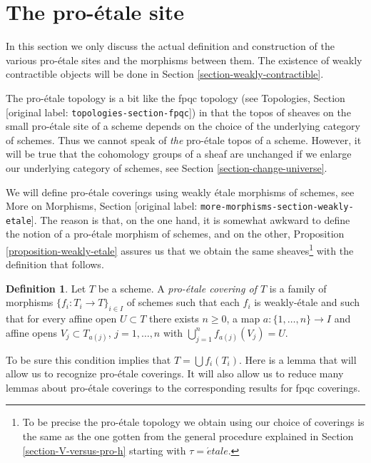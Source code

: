 \documentclass[10pt,a4paper]{article}
\theoremstyle{plain}
\theoremstyle{definition}
\newtheorem{definition}[subsection]{Definition}
\theoremstyle{remark}
\numberwithin{equation}{subsection}
\def\etale{{\acute{e}tale}}
\begin{document}
\section{The pro-\'etale site}
\label{section-proetale}

\noindent
In this section we only discuss the actual definition and construction
of the various pro-\'etale sites and the morphisms between them. The
existence of weakly contractible objects will be done in
Section \ref{section-weakly-contractible}.

\medskip\noindent
The pro-\'etale topology is a bit like
the fpqc topology (see Topologies, Section \textnormal{[original label: \nolinkurl{topologies-section-fpqc}]})
in that the topos of sheaves on the small pro-\'etale site of a scheme
depends on the choice of the underlying category of schemes. Thus we cannot
speak of {\it the} pro-\'etale topos of a scheme. However, it will be
true that the cohomology groups of a sheaf are unchanged if we enlarge
our underlying category of schemes, see Section \ref{section-change-universe}.

\medskip\noindent
We will define pro-\'etale coverings using weakly \'etale morphisms of schemes,
see More on Morphisms, Section \textnormal{[original label: \nolinkurl{more-morphisms-section-weakly-etale}]}.
The reason is that, on the one hand, it is somewhat awkward to define
the notion of a pro-\'etale morphism of schemes, and on the other,
Proposition \ref{proposition-weakly-etale}
assures us that we obtain the same sheaves\footnote{To be precise
the pro-\'etale topology we obtain using our choice of coverings
is the same as the one gotten from the general procedure explained
in Section \ref{section-V-versus-pro-h} starting with $\tau = \etale$.}
with the definition that follows.

\begin{definition}
\label{definition-fpqc-covering}
Let $T$ be a scheme. A {\it pro-\'etale covering of $T$} is a family
of morphisms $\{f_i : T_i \to T\}_{i \in I}$ of schemes
such that each $f_i$ is weakly-\'etale and such that for every affine open
$U \subset T$ there exists $n \geq 0$, a map
$a : \{1, \ldots, n\} \to I$ and affine opens
$V_j \subset T_{a(j)}$, $j = 1, \ldots, n$
with $\bigcup_{j = 1}^n f_{a(j)}(V_j) = U$.
\end{definition}

\noindent
To be sure this condition implies that $T = \bigcup f_i(T_i)$.
Here is a lemma that will allow us to recognize pro-\'etale coverings.
It will also allow us to reduce many lemmas about pro-\'etale coverings
to the corresponding results for fpqc coverings.
\end{document}
